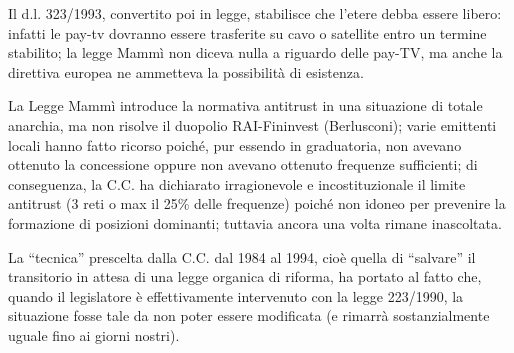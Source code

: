 Il d.l. 323/1993, convertito poi in legge, stabilisce che l’etere debba essere libero: infatti le pay-tv dovranno essere trasferite su cavo o satellite entro un termine stabilito; la legge Mammì non diceva nulla a riguardo delle pay-TV, ma anche la direttiva europea ne ammetteva la possibilità di esistenza.


La Legge Mammì introduce la normativa antitrust in una situazione di totale anarchia, ma non risolve il duopolio RAI-Fininvest (Berlusconi); varie emittenti locali hanno fatto ricorso poiché, pur essendo in graduatoria, non avevano ottenuto la concessione oppure non avevano ottenuto frequenze sufficienti; di conseguenza, la C.C. ha dichiarato irragionevole e incostituzionale il limite antitrust (3 reti o max il 25\% delle
frequenze) poiché non idoneo per prevenire la formazione di posizioni dominanti; tuttavia ancora una volta rimane inascoltata.

La “tecnica” prescelta dalla C.C. dal 1984 al 1994, cioè quella di “salvare” il transitorio in attesa di una legge organica di riforma, ha portato al fatto che, quando il legislatore è effettivamente intervenuto con la legge 223/1990, la situazione fosse tale da non poter essere modificata (e rimarrà sostanzialmente uguale fino ai giorni nostri).
